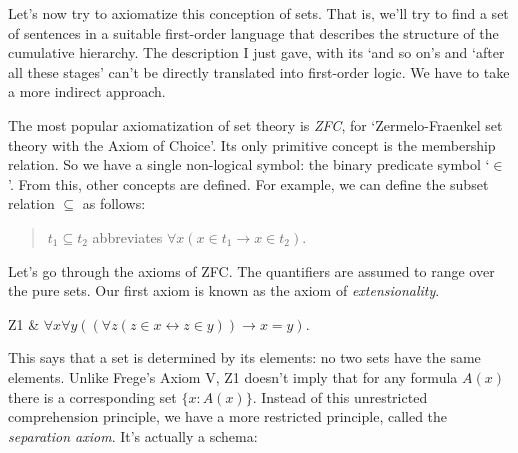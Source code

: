 
Let's now try to axiomatize this conception of sets.
That is,
we'll try to find a set of sentences in a suitable first-order language
that describes the structure of the cumulative hierarchy.
The description I just gave,
with its `and so on's and `after all these stages' can't be directly translated into first-order logic.
We have to take a more indirect approach.

The most popular axiomatization of set theory is \emph{ZFC},
for `Zermelo-Fraenkel set theory with the Axiom of Choice'.
Its only primitive concept is the membership relation.
So we have a single non-logical symbol:
the binary predicate symbol `$\in$'.
From this,
other concepts are defined.
For example,
we can define the subset relation $\subseteq$ as follows:

\begin{quote}
   $t_1 \subseteq t_2$ abbreviates $\forall x (x \in t_1 \rightarrow x \in t_2)$.
\end{quote}


Let's go through the axioms of ZFC.
The quantifiers are assumed to range over the pure sets.
Our first axiom is known as the axiom of \emph{extensionality}.

\begin{axioms}
  Z1 & $\forall x\forall y( (\forall z(z\in x\leftrightarrow z\in y)) \to x=y ).$
\end{axioms}

This says that a set is determined by its elements:
no two sets have the same elements.
Unlike Frege's Axiom V,
Z1 doesn't imply that
for any formula $A(x)$ there is a corresponding set $\{ x : A(x) \}$.
Instead of this unrestricted comprehension principle,
we have a more restricted principle,
called the \emph{separation axiom}.
It's actually a schema:

